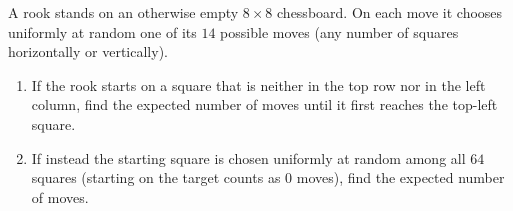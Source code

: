 A rook stands on an otherwise empty $8\times8$ chessboard. On each move it chooses uniformly at random one of its $14$ possible moves (any number of squares horizontally or vertically).
\begin{enumerate}
\item[(a)] If the rook starts on a square that is neither in the top row nor in the left column, find the expected number of moves until it first reaches the top-left square.
\item[(b)] If instead the starting square is chosen uniformly at random among all $64$ squares (starting on the target counts as $0$ moves), find the expected number of moves.
\end{enumerate}
